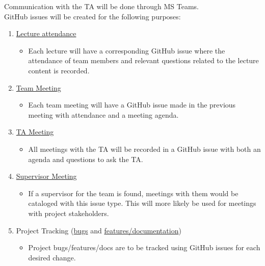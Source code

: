 \documentclass{article}
\begin{document}
Communication with the TA will be done through MS Teams. \\

GitHub issues will be created for the following purposes:

\begin{enumerate}
    \item \href{https://github.com/russellrd/realm/blob/main/.github/ISSUE_TEMPLATE/lect.md}{Lecture attendance}
    \begin{itemize}
        \item Each lecture will have a corresponding GitHub issue where the attendance of team members and relevant questions related to the lecture content is recorded.
    \end{itemize}
    \item \href{https://github.com/russellrd/realm/blob/main/.github/ISSUE_TEMPLATE/team_meet.md}{Team Meeting}
    \begin{itemize}
        \item Each team meeting will have a GitHub issue made in the previous meeting with attendance and a meeting agenda.
    \end{itemize}
    \item \href{https://github.com/russellrd/realm/blob/main/.github/ISSUE_TEMPLATE/ta_meet.md}{TA Meeting}
    \begin{itemize}
        \item All meetings with the TA will be recorded in a GitHub issue with both an agenda and questions to ask the TA.
    \end{itemize}
    \item \href{https://github.com/russellrd/realm/blob/main/.github/ISSUE_TEMPLATE/sup_meet.md}{Supervisor Meeting}
    \begin{itemize}
        \item If a supervisor for the team is found, meetings with them would be cataloged with this issue type. This will more likely be used for meetings with project stakeholders.
    \end{itemize}
    \item Project Tracking (\href{https://github.com/russellrd/realm/blob/main/.github/ISSUE_TEMPLATE/bug.md}{bugs} and \href{https://github.com/russellrd/realm/blob/main/.github/ISSUE_TEMPLATE/feature_or_doc.md}{features/documentation})
    \begin{itemize}
        \item Project bugs/features/docs are to be tracked using GitHub issues for each desired change.
    \end{itemize}
\end{enumerate}
\end{document}
